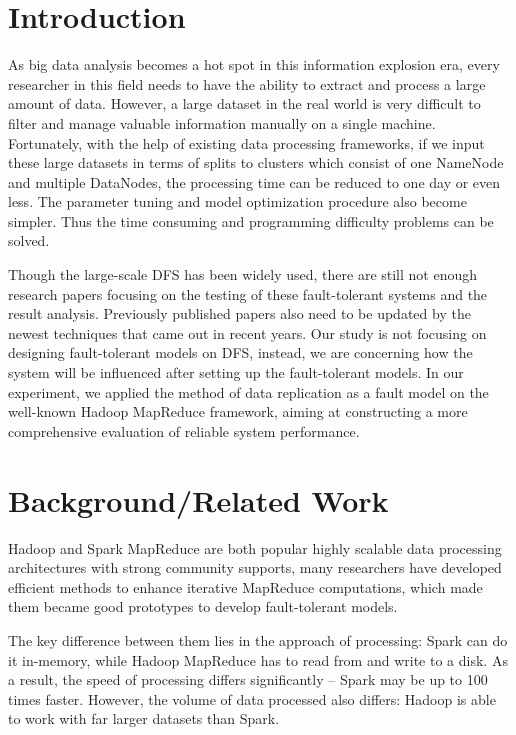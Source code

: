 \documentclass[11pt,twocolumn]{article}
\begin{document}
\section{Introduction}
As big data analysis becomes a hot spot in this information explosion era, every researcher in this field needs to have the ability to extract and process a large amount of data. However, a large dataset in the real world is very difficult to filter and manage valuable information manually on a single machine. Fortunately, with the help of existing data processing frameworks, if we input these large datasets in terms of splits to clusters which consist of one NameNode and multiple DataNodes, the processing time can be reduced to one day or even less. The parameter tuning and model optimization procedure also become simpler. Thus the time consuming and programming difficulty problems can be solved. \par

Though the large-scale DFS has been widely used, there are still not enough research papers focusing on the testing of these fault-tolerant systems and the result analysis. Previously published papers also need to be updated by the newest techniques that came out in recent years. Our study is not focusing on designing fault-tolerant models on DFS, instead, we are concerning how the system will be influenced after setting up the fault-tolerant models. In our experiment, we applied the method of data replication as a fault model on the well-known Hadoop MapReduce framework, aiming at constructing a more comprehensive evaluation of reliable system performance.
\section{Background/Related Work}
Hadoop and Spark MapReduce are both popular highly scalable data processing architectures with strong community supports\cite{ranger2007evaluating,zaharia2008improving}, many researchers have developed efficient methods to enhance iterative MapReduce computations\cite{bhatotia2011incoop,ekanayake2010twister,ekanayake2008mapreduce,fadika2010lemo}, which made them became good prototypes to develop fault-tolerant models.\par

The key difference between them lies in the approach of processing: Spark can do it in-memory, while Hadoop MapReduce has to read from and write to a disk. As a result, the speed of processing differs significantly – Spark may be up to 100 times faster. However, the volume of data processed also differs: Hadoop is able to work with far larger datasets than Spark. 
\end{document}
